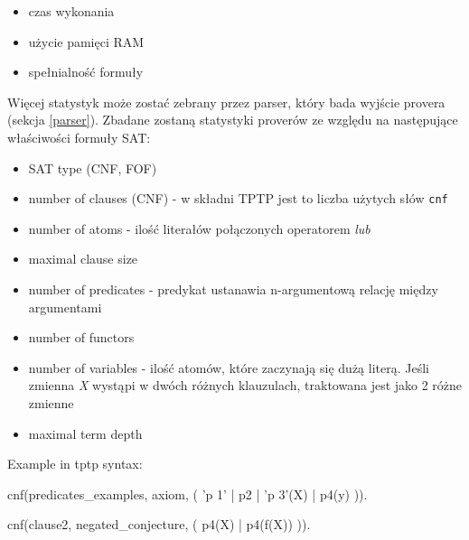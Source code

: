 \documentclass[a4paper,12pt]{article}
\begin{document}
\begin{itemize}
  \item czas wykonania
  \item użycie pamięci RAM
  \item spełnialność formuły
\end{itemize}

\noindent
Więcej statystyk może zostać zebrany przez parser, który bada wyjście provera (sekcja \ref{parser}).
\newline
Zbadane zostaną statystyki proverów ze względu na następujące właściwości formuły SAT:

\begin{itemize}
  \item SAT type (CNF, FOF)
  \item number of clauses (CNF) - w składni TPTP jest to liczba użytych słów \texttt{cnf}
  \item number of atoms - ilość literałów połączonych operatorem \textit{lub}
  \item maximal clause size
  \item number of predicates - predykat ustanawia n-argumentową relację między argumentami
  \item number of functors
  \item number of variables - ilość atomów, które zaczynają się dużą literą. Jeśli zmienna \textit{X} wystąpi w dwóch różnych klauzulach, traktowana jest jako 2 różne zmienne
  \item maximal term depth
\end{itemize}

Example in tptp syntax:

\begin{tptpcode}

cnf(predicates_examples, axiom,
  ( 'p 1' %
  | p2
  | 'p 3'(X) %
  | p4(y) %
  )).

cnf(clause2, negated_conjecture,
    ( p4(X)
    | p4(f(X)) %
    )).

\end{tptpcode}

\end{document}
